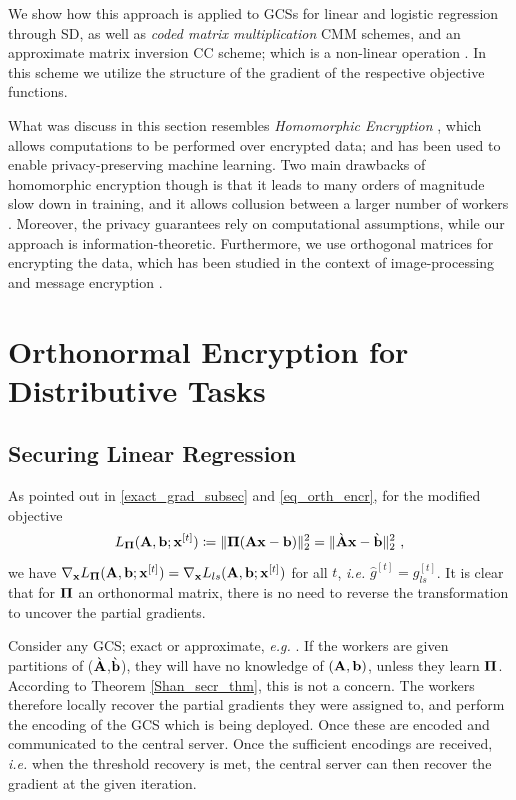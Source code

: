 \documentclass[journal,letterpaper,onecolumn,twoside,nofonttune]{IEEEtran}
\newcommand{\xb}{\bold{x}}
\newcommand{\Pibold}{\bold{\Pi}}
\newcommand{\gh}{\hat{g}}
\newcommand{\Ab}{\bold{A}}
\newcommand{\Abg}{{\grave{\bold{A}}}}
\newcommand{\bb}{\bold{b}}
\newcommand{\bbg}{{\grave{\bold{b}}}}
\begin{document}
We show how this approach is applied to GCSs for linear and logistic regression through SD, as well as \textit{coded matrix multiplication} CMM schemes, and an approximate matrix inversion CC scheme; which is a non-linear operation \cite{CPH20b}. In this scheme we utilize the structure of the gradient of the respective objective functions.

What was discuss in this section resembles \textit{Homomorphic Encryption} \cite{Gen09,Gen09a,BGV14}, which allows computations to be performed over encrypted data; and has been used to enable privacy-preserving machine learning. Two main drawbacks of homomorphic encryption though is that it leads to many orders of magnitude slow down in training, and it allows collusion between a larger number of workers \cite{SGAM19}. Moreover, the privacy guarantees rely on computational assumptions, while our approach is information-theoretic. Furthermore, we use orthogonal matrices for encrypting the data, which has been studied in the context of image-processing and message encryption \cite{khan2015hill,AKHK17,AMAK18,Cac14,AID19,reddy2018image}.

\section{Orthonormal Encryption for Distributive Tasks}
\label{orth_encr_distr_tasks}

\subsection{Securing Linear Regression}
\label{orth_Lin_regr}

As pointed out in \ref{exact_grad_subsec} and \eqref{eq_orth_encr}, for the modified objective
$$ L_{\Pibold}(\Ab,\bb;\xb^{[t]}) \coloneqq \|\Pibold(\Ab\xb-\bb)\|_2^2 = \|\Abg\xb-\bbg\|_2^2 \ , $$
we have $\nabla_{\xb}L_{\Pibold}(\Ab,\bb;\xb^{[t]}) = \nabla_{\xb}L_{ls}(\Ab,\bb;\xb^{[t]})$ for all $t$, \textit{i.e.} $\gh^{[t]}=g_{ls}^{[t]}$. It is clear that for $\Pibold$ an orthonormal matrix, there is no need to reverse the transformation to uncover the partial gradients.

Consider any GCS; exact or approximate, \textit{e.g.} \cite{TLDK17,HASH17,OGU19,CMH20,YA18,CT22,RTTD17,CP18,CPE17,WCP19,BWE19,WLS19,KKR19,HYKM19,CHZP18,CPH20a}. If the workers are given partitions of ($\Abg$,$\bbg$), they will have no knowledge of $(\Ab,\bb)$, unless they learn $\Pibold$. According to Theorem \ref{Shan_secr_thm}, this is not a concern. The workers therefore locally recover the partial gradients they were assigned to, and perform the encoding of the GCS which is being deployed. Once these are encoded and communicated to the central server. Once the sufficient encodings are received, \textit{i.e.} when the threshold recovery is met, the central server can then recover the gradient at the given iteration.
\end{document}
